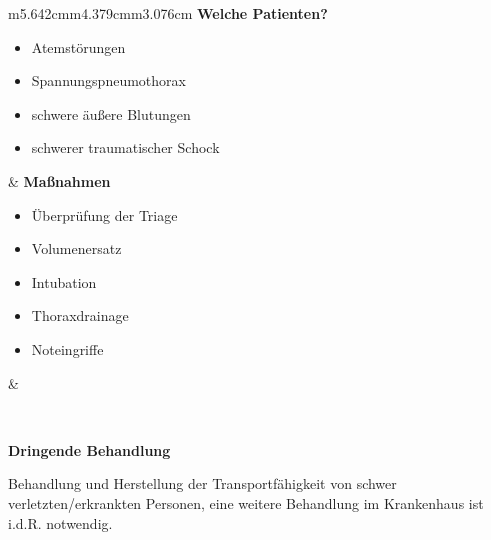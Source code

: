 \documentclass{article}
\newcommand\gEs[1]{\textbf{\textcolor[rgb]{0.0,0.0,0.5019608}{#1}}}
\newcommand\gEs[1]{\textbf{\textcolor[rgb]{0.0,0.0,0.5019608}{#1}}}
\begin{document}
\begin{flushleft}
\tablehead{}\begin{supertabular}{m{5.642cm}m{4.379cm}m{3.076cm}}
{\mdseries \gEs{Welche Patienten?}}

\begin{itemize}
\item {\mdseries Atemst\"orungen}

\item {\mdseries Spannungspneumothorax}

\item {\mdseries schwere \"au{\ss}ere Blutungen}

\item {\mdseries schwerer traumatischer Schock}

\end{itemize}
 &
{\mdseries \gEs{Ma{\ss}nahmen}}

\begin{itemize}
\item {\mdseries \"Uberpr\"ufung der Triage}

\item {\mdseries Volumenersatz}

\item {\mdseries Intubation}

\item {\mdseries Thoraxdrainage}

\item {\mdseries Noteingriffe}

\end{itemize}
 &
{%
 \par}

\\
\end{supertabular}
\end{flushleft}
{\mdseries\color{black}
\gEs{Dringende Behandlung}}

{\mdseries
Behandlung und Herstellung der Transportf\"ahigkeit von schwer
verletzten/erkrankten Personen, eine weitere Behandlung im Krankenhaus
ist i.d.R. notwendig.}
\end{document}
